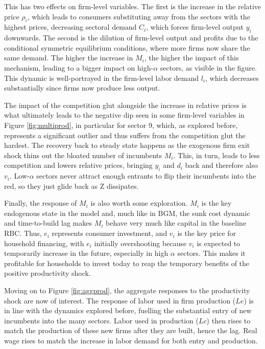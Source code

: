 \documentclass[a4paper,12pt]{article} %
\numberwithin{equation}{section} %
\numberwithin{figure}{section}
\numberwithin{table}{section}
\begin{document}
This has two effects on firm-level variables. The first is the
increase in the relative price $\rho_i$, which leads to consumers substituting away from the sectors with the highest prices, decreasing
sectoral demand $C_i$, which forces firm-level output $y_i$ downwards. The second is the dilution of
firm-level output and profits due to the conditional symmetric equilibrium conditions, where more firms now share the same demand.
The higher the increase in $M_i$, the higher the impact of this mechanism, leading to a bigger impact on high-$\alpha$ sectors, as visible
in the figure. This dynamic is well-portrayed in the firm-level labor demand $l_i$, which decreases substantially since firms now produce 
less output.

The impact of the competition glut alongside the increase in relative prices is what ultimately leads to the negative dip seen in some firm-level variables in
Figure \ref{fig:multiprod}, in particular for sector 9, which, as explored before, represents a significant outlier 
and thus suffers from the competition glut the hardest. The recovery back to steady state happens as the exogenous firm exit shock
thins out the bloated number of incumbents $M_i$. This, in turn, leads to less competition and lowers relative prices, bringing $y_i$ and $d_i$
back and therefore also $v_i$. Low-$\alpha$ sectors never attract enough entrants to flip their incumbents into the red, so they just glide
back as Z dissipates.

Finally, the response of $M_i$ is also worth some exploration. $M_i$ is the key endogenous state in the model and,
much like in BGM, the sunk cost dynamic and time-to-build lag makes $M_i$ behave very much like capital in the 
baseline RBC. Thus, $e_i$ represents consumer investment, and $v_i$ is the key price for household financing, with $e_i$ initially overshooting
because $v_i$ is expected to temporarily increase in the future, especially in high $\alpha$ sectors. This makes it profitable for households
to invest today to reap the temporary benefits of the positive productivity shock.

Moving on to Figure \ref{fig:aggprod}, the aggregate responses to the productivity shock are now of interest. The response of labor used in
firm production ($Le$) is in line with the dynamics explored before, fuelling the substantial entry of new incumbents into the many sectors.
Labor used in production ($Lc$) then rises to match the production of these new firms after they are built, hence the lag. Real wage rises to
match the increase in labor demand for both entry and production.
\end{document}
